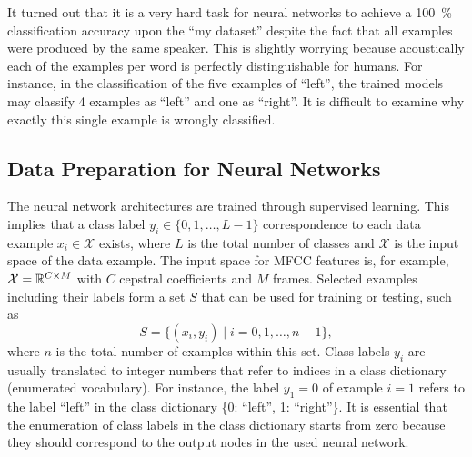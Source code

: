 \FloatBarrier
\noindent
It turned out that it is a very hard task for neural networks to achieve a \SI{100}{\percent} classification accuracy upon the \enquote{my dataset} despite the fact that all examples were produced by the same speaker.
This is slightly worrying because acoustically each of the examples per word is perfectly distinguishable for humans.
For instance, in the classification of the five examples of \enquote{left}, the trained models may classify 4 examples as \enquote{left} and one as \enquote{right}.
It is difficult to examine why exactly this single example is wrongly classified.



\subsection{Data Preparation for Neural Networks}\label{sec:exp_data_prep}
The neural network architectures are trained through supervised learning.
This implies that a class label $y_i \in \{0, 1, \dots, L - 1\}$ correspondence to each data example $x_i \in \mathcal{X}$ exists, where $L$ is the total number of classes and $\mathcal{X}$ is the input space of the data example.
The input space for MFCC features is, for example, $\mathcal{X} = \mathbb{R}^{C \times M}$ with $C$ cepstral coefficients and $M$ frames.
Selected examples including their labels form a set $S$ that can be used for training or testing, such as
\begin{equation}\label{eq:exp_dataset}
  S = \{ (x_i, y_i) \mid i = 0, 1, \dots, n - 1 \},
\end{equation}
where $n$ is the total number of examples within this set.
Class labels $y_i$ are usually translated to integer numbers that refer to indices in a class dictionary (enumerated vocabulary).
For instance, the label $y_1 = 0$ of example $i=1$ refers to the label \enquote{left} in the class dictionary \{0: \enquote{left}, 1: \enquote{right}\}.
It is essential that the enumeration of class labels in the class dictionary starts from zero because they should correspond to the output nodes in the used neural network.

